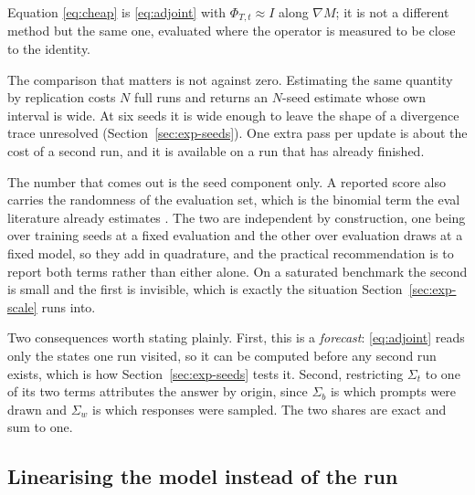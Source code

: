 Equation \eqref{eq:cheap} is \eqref{eq:adjoint} with $\Phi_{T,t} \approx I$ along $\nabla M$; it is
not a different method but the same one, evaluated where the operator is measured to be close to
the identity.

The comparison that matters is not against zero. Estimating the same quantity by replication costs
$N$ full runs and returns an $N$-seed estimate whose own interval is wide. At six seeds it is wide
enough to leave the shape of a divergence trace unresolved (Section~\ref{sec:exp-seeds}). One extra
pass per update is about the cost of a second run, and it is available on a run that has already
finished.

The number that comes out is the seed component only. A reported score also carries the randomness
of the evaluation set, which is the binomial term the eval literature already estimates
\citep{miller2024adding}. The two are independent by construction, one being over training seeds at
a fixed evaluation and the other over evaluation draws at a fixed model, so they add in quadrature,
and the practical recommendation is to report both terms rather than either alone. On a saturated
benchmark the second is small and the first is invisible, which is exactly the situation
Section~\ref{sec:exp-scale} runs into.

Two consequences worth stating plainly. First, this is a \emph{forecast}: \eqref{eq:adjoint} reads
only the states one run visited, so it can be computed before any second run exists, which is how
Section~\ref{sec:exp-seeds} tests it. Second, restricting $\Sigma_t$ to one of its two terms
attributes the answer by origin, since $\Sigma_b$ is which prompts were drawn and $\Sigma_w$ is
which responses were sampled. The two shares are exact and sum to one.

\subsection{Linearising the model instead of the run}
\label{sec:tangent}

